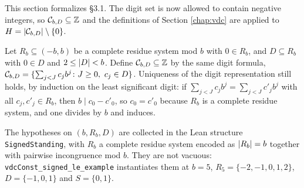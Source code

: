 This section formalizes \S3.1. The digit set is now allowed to contain
negative integers, so $\mathcal{C}_{b,D} \subseteq \mathbb{Z}$ and the definitions of
Section \ref{chap:vdc} are applied to $H = \left\lvert \mathcal{C}_{b,D} \right\rvert \setminus \{0\}$.

\begin{definition}
  \label{def:signedCantorSet}
  \leanok
  Let $R_b \subseteq (-b, b)$ be a complete residue system mod $b$ with
  $0 \in R_b$, and $D \subseteq R_b$ with $0 \in D$ and
  $2 \leq \left\lvert D \right\rvert < b$. Define $\mathcal{C}_{b,D} \subseteq \mathbb{Z}$ by the same digit formula,
  $\mathcal{C}_{b,D} = \{\sum_{j < J} c_j b^j \colon J \geq 0,\ c_j \in D\}$.
  Uniqueness of the digit representation still holds, by induction on the
  least significant digit: if $\sum_{j<J} c_j b^j = \sum_{j<J} c'_j b^j$ with
  all $c_j, c'_j \in R_b$, then $b \mid c_0 - c'_0$, so $c_0 = c'_0$ because
  $R_b$ is a complete residue system, and one divides by $b$ and induces.

  The hypotheses on $(b, R_b, D)$ are collected in the Lean structure
  \texttt{SignedStanding}, with $R_b$ a complete residue system encoded as
  $\left\lvert R_b \right\rvert = b$ together with pairwise incongruence mod $b$.  They are not
  vacuous: \texttt{vdcConst\_signed\_le\_example} instantiates them at
  $b = 5$, $R_5 = \{-2,-1,0,1,2\}$, $D = \{-1,0,1\}$ and $S = \{0,1\}$.
\end{definition}

